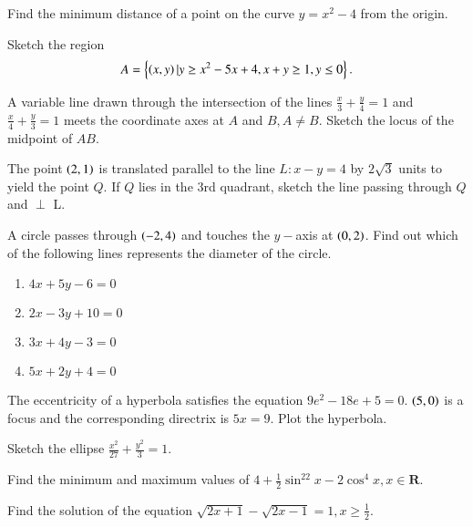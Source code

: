 \documentclass[journal,12pt,onecolumn]{IEEEtran}
\begin{document}
\begin{problem}
Find the minimum distance of a point on the curve $y = x^2 -4$ from the origin.
\end{problem}
\begin{problem}
Sketch the region
\begin{equation}
A = \left\{\left(x,y\right)\vert y \geq x^2-5x+4, x + y \geq 1, y \leq 0\right\}.
\end{equation}
\end{problem}
\begin{problem}
A variable line drawn through the intersection of the lines $\frac{x}{3} + \frac{y}{4} = 1$ and $\frac{x}{4} + \frac{y}{3} = 1$ meets the coordinate axes at $A$ and $B, A \neq B$.  Sketch the locus of the midpoint of $AB$.
\end{problem}
\begin{problem}
The point $\left(2,1\right)$ is translated parallel to the line $L:x-y=4$ by $2\sqrt{3}$ units to yield the point $Q$.  If $Q$ lies in the 3rd quadrant, sketch the line passing through $Q$ and $\perp$ L.
\end{problem}
\begin{problem}
A circle passes through $\left(-2,4\right)$ and touches the $y-$axis at $\left(0,2\right)$. Find out which of the following lines represents the diameter of the circle.
\begin{enumerate}
\item $4x+5y-6=0$
\item $2x-3y +10 = 0$
\item $3x+4y-3 = 0$
\item $5x+2y+4 = 0$
\end{enumerate}
\end{problem}
%
\begin{problem}
The eccentricity of a hyperbola satisfies the equation $9e^2-18e+5 = 0$. $\left(5,0\right)$ is a focus and the corresponding directrix is $5x = 9$. Plot the hyperbola.
\end{problem}
%
\begin{problem}
Sketch the ellipse $\frac{x^2}{27} + \frac{y^2}{3} = 1$.
\end{problem}
\begin{problem}
Find the minimum and maximum values of $4 + \frac{1}{2}\sin^22x - 2\cos^4 x, x \in \mathbf{R}$. 
\end{problem}
\begin{problem}
Find the solution of the equation $\sqrt{2x+1}- \sqrt{2x-1} = 1, x \geq \frac{1}{2}$.
\end{problem}
\end{document}
